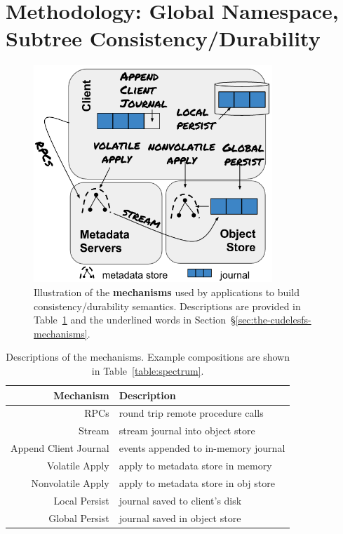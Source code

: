 \section{Methodology: Global Namespace, Subtree Consistency/Durability}
\label{sec:methodology-decoupled-namespaces}

\begin{figure}[tb]
\centering
\includegraphics[width=90mm]{./chapters/cudele/figures/fig-decouple.png}
\caption{Illustration of the \textbf{mechanisms} used by applications to build
consistency/durability semantics. Descriptions are provided in
Table~\ref{table:mechanisms} and the underlined words in
Section~\S\ref{sec:the-cudelesfs-mechanisms}.}\label{fig:decouple}
\end{figure}

\begin{table}
\centering
\ssp
\begin{tabular}{ r | l }
  Mechanism         & Description \\\hline
  RPCs              & round trip remote procedure calls \\
  Stream            & stream journal into object store \\
  Append Client Journal & events appended to in-memory journal \\
  Volatile Apply & apply to metadata store in memory \\
  Nonvolatile Apply    & apply to metadata store in obj store \\
  Local Persist     & journal saved to client's disk \\
  Global Persist    & journal saved in object store \\
\end{tabular}
\dsp
\caption{Descriptions of the mechanisms. Example compositions are shown in Table~\ref{table:spectrum}.\label{table:mechanisms}} 
\end{table}


